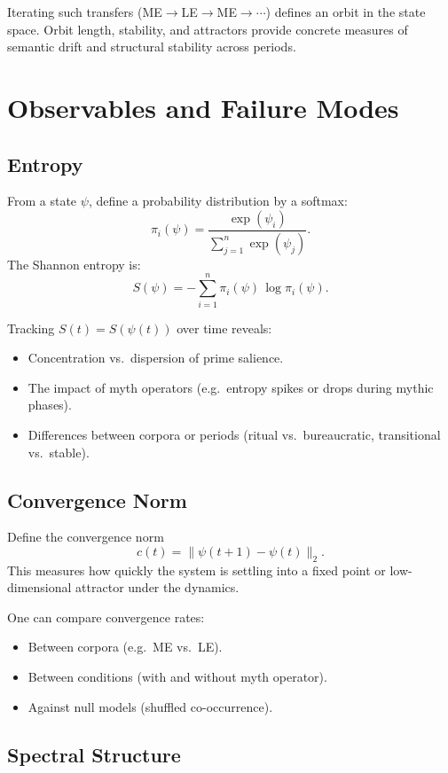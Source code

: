 \documentclass[11pt]{article}
\begin{document}
Iterating such transfers (ME$\to$LE$\to$ME$\to\cdots$) defines an
orbit in the state space. Orbit length, stability, and attractors
provide concrete measures of semantic drift and structural stability
across periods.

\section{Observables and Failure Modes}

\subsection{Entropy}

From a state \(\psi\), define a probability distribution by a softmax:
\[
\pi_i(\psi) = \frac{\exp(\psi_i)}{\sum_{j=1}^n \exp(\psi_j)}.
\]
The Shannon entropy is:
\[
S(\psi) = -\sum_{i=1}^n \pi_i(\psi)\,\log \pi_i(\psi).
\]

Tracking \(S(t) = S(\psi(t))\) over time reveals:

\begin{itemize}[nosep]
  \item Concentration vs.\ dispersion of prime salience.
  \item The impact of myth operators (e.g.\ entropy spikes or drops
        during mythic phases).
  \item Differences between corpora or periods (ritual vs.\ bureaucratic,
        transitional vs.\ stable).
\end{itemize}

\subsection{Convergence Norm}

Define the convergence norm
\[
c(t) = \|\psi(t+1) - \psi(t)\|_2.
\]
This measures how quickly the system is settling into a fixed point
or low-dimensional attractor under the dynamics.

One can compare convergence rates:
\begin{itemize}[nosep]
  \item Between corpora (e.g.\ ME vs.\ LE).
  \item Between conditions (with and without myth operator).
  \item Against null models (shuffled co-occurrence).
\end{itemize}

\subsection{Spectral Structure}
\end{document}
